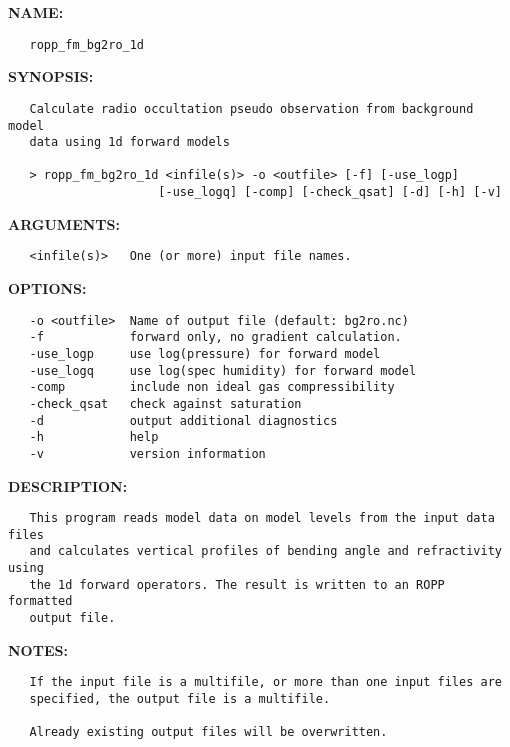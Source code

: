 \label{ch:robo71}
\label{ch:Programs_ropp_fm_bg2ro_1d}
\textbf{NAME:}\hspace{0.08in}\begin{Verbatim}
   ropp_fm_bg2ro_1d
\end{Verbatim}
\textbf{SYNOPSIS:}\hspace{0.08in}\begin{Verbatim}
   Calculate radio occultation pseudo observation from background model
   data using 1d forward models

   > ropp_fm_bg2ro_1d <infile(s)> -o <outfile> [-f] [-use_logp]
                     [-use_logq] [-comp] [-check_qsat] [-d] [-h] [-v]
\end{Verbatim}
\textbf{ARGUMENTS:}\hspace{0.08in}\begin{Verbatim}
   <infile(s)>   One (or more) input file names.
\end{Verbatim}
\textbf{OPTIONS:}\hspace{0.08in}\begin{Verbatim}
   -o <outfile>  Name of output file (default: bg2ro.nc)
   -f            forward only, no gradient calculation.
   -use_logp     use log(pressure) for forward model
   -use_logq     use log(spec humidity) for forward model
   -comp         include non ideal gas compressibility
   -check_qsat   check against saturation
   -d            output additional diagnostics
   -h            help
   -v            version information
\end{Verbatim}
\textbf{DESCRIPTION:}\hspace{0.08in}\begin{Verbatim}
   This program reads model data on model levels from the input data files
   and calculates vertical profiles of bending angle and refractivity using
   the 1d forward operators. The result is written to an ROPP formatted
   output file.
\end{Verbatim}
\textbf{NOTES:}\hspace{0.08in}\begin{Verbatim}
   If the input file is a multifile, or more than one input files are
   specified, the output file is a multifile.

   Already existing output files will be overwritten.
\end{Verbatim}
